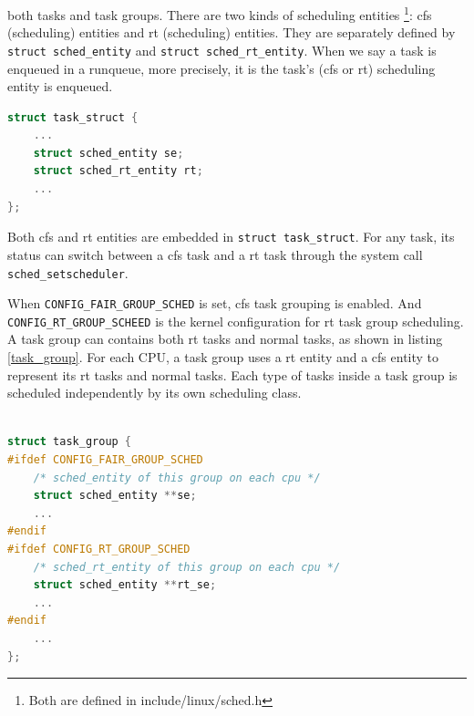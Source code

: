 both tasks and task groups. There are two kinds of scheduling entities
\footnote{Both are defined in include/linux/sched.h}:
cfs (scheduling) entities and rt (scheduling) entities.
They are separately defined by \texttt{struct sched\_entity} 
and \texttt{struct sched\_rt\_entity}.
When we say a task is enqueued in a runqueue, more precisely, it is the task's
(cfs or rt) scheduling entity is enqueued.
\begin{lstlisting}[language=C, 
			caption={\texttt{A task embeds scheduling entities}},
			label={task_struct}]
struct task_struct {
	...
	struct sched_entity se;
	struct sched_rt_entity rt;
	...
};
\end{lstlisting}
Both cfs and rt entities are embedded in \texttt{struct task\_struct}. 
For any task, its status can switch between a cfs task and a rt task
through the system call \texttt{sched\_setscheduler}.

When \texttt{CONFIG\_FAIR\_GROUP\_SCHED} is set, cfs task grouping 
is enabled. And \texttt{CONFIG\_RT\_GROUP\_SCHEED} is the kernel configuration
for rt task group scheduling. A task group can contains both rt tasks and
normal tasks, as shown in listing \ref{task_group}. For each CPU, a task group
uses a rt entity and a cfs entity to represent its rt tasks and normal tasks.
Each type of tasks inside a task group is scheduled independently by 
its own scheduling class.
\begin{lstlisting}[language=C,
			caption={\texttt{A task group}},
			label={task_group}]		

struct task_group {
#ifdef CONFIG_FAIR_GROUP_SCHED
	/* sched_entity of this group on each cpu */
	struct sched_entity **se;
	...
#endif
#ifdef CONFIG_RT_GROUP_SCHED
	/* sched_rt_entity of this group on each cpu */
	struct sched_entity **rt_se;
	...
#endif
	...
};
\end{lstlisting}

